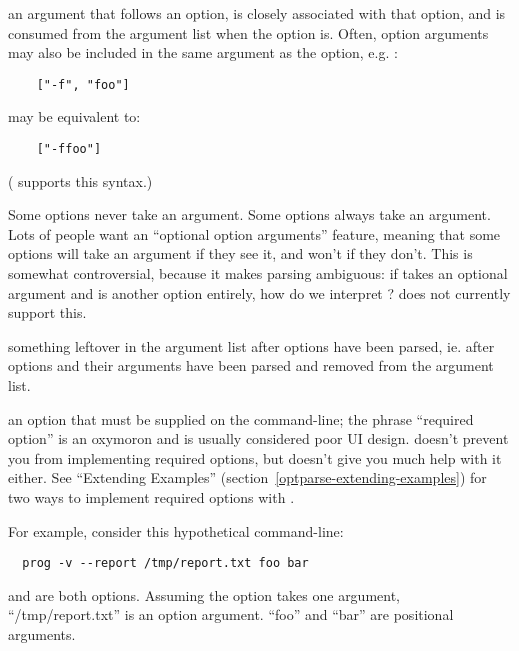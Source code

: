 \begin{definitions}
an argument that follows an option, is closely associated with that
option, and is consumed from the argument list when the option is.
Often, option arguments may also be included in the same argument as
the option, e.g. :

\begin{verbatim}
    ["-f", "foo"]
\end{verbatim}

may be equivalent to:

\begin{verbatim}
    ["-ffoo"]
\end{verbatim}

( supports this syntax.)

Some options never take an argument.  Some options always take an
argument.  Lots of people want an ``optional option arguments'' feature,
meaning that some options will take an argument if they see it, and
won't if they don't.  This is somewhat controversial, because it makes
parsing ambiguous: if  takes an optional argument and
 is another option entirely, how do we interpret
?   does not currently support this.

something leftover in the argument list after options have been
parsed, ie. after options and their arguments have been parsed and
removed from the argument list.

an option that must be supplied on the command-line; the phrase
``required option'' is an oxymoron and is usually considered poor UI
design.   doesn't prevent you from implementing
required options, but doesn't give you much help with it either.  See
``Extending Examples'' (section~\ref{optparse-extending-examples}) for
two ways to implement required options with .

\end{definitions}

For example, consider this hypothetical command-line:

\begin{verbatim}
  prog -v --report /tmp/report.txt foo bar
\end{verbatim}

 and  are both options.  Assuming
the  option takes one argument,
``/tmp/report.txt'' is an option argument.  ``foo'' and ``bar'' are
positional arguments.

